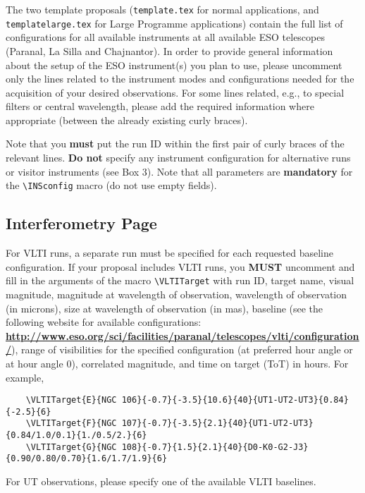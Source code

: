\documentclass{article}
\begin{document}
The two template proposals ({\tt template.tex} for normal
applications, and {\tt templatelarge.tex} for Large Programme applications) contain
the full list of configurations for all available instruments at all
available ESO telescopes (Paranal, La Silla and Chajnantor).  In order
to provide general information about the setup of the ESO instrument(s) you plan
to use, please uncomment only the lines related to the instrument
modes and configurations needed for the acquisition of your desired
observations.  For some lines related, e.g., to special filters or
central wavelength, please add the required information where
appropriate (between the already existing curly
braces).

Note that you {\bf must} put the run ID within the first pair of curly
braces of the relevant lines. {\bf Do not} specify any instrument
configuration for alternative runs or visitor instruments (see Box 3). 
Note that all parameters are {\bf mandatory} for the \verb|\INSconfig|
macro (do not use empty fields).

\subsection{Interferometry Page}
\label{sec:vlti}

For VLTI runs, a separate run must be specified for each requested baseline configuration.
If your proposal includes VLTI runs, you {\bf MUST} uncomment and fill in the arguments of the macro \verb|\VLTITarget| with run ID, target name, visual
magnitude, magnitude at wavelength of observation, wavelength of
observation (in microns), size at wavelength of observation (in mas),
baseline (see the following website for available configurations:
\href{http://www.eso.org/sci/facilities/paranal/telescopes/vlti/configuration/}{\bf\underline{http://www.eso.org/sci/facilities/paranal/telescopes/vlti/configuration/}}), 
range of visibilities for the specified configuration (at preferred hour angle or at hour angle 0), correlated magnitude, and time on target (ToT) in hours. For example,
\begin{verbatim}
    \VLTITarget{E}{NGC 106}{-0.7}{-3.5}{10.6}{40}{UT1-UT2-UT3}{0.84}{-2.5}{6}
    \VLTITarget{F}{NGC 107}{-0.7}{-3.5}{2.1}{40}{UT1-UT2-UT3}{0.84/1.0/0.1}{1./0.5/2.}{6}
    \VLTITarget{G}{NGC 108}{-0.7}{1.5}{2.1}{40}{D0-K0-G2-J3}{0.90/0.80/0.70}{1.6/1.7/1.9}{6}
\end{verbatim}

For UT observations, please specify one of the available VLTI baselines.
\end{document}
